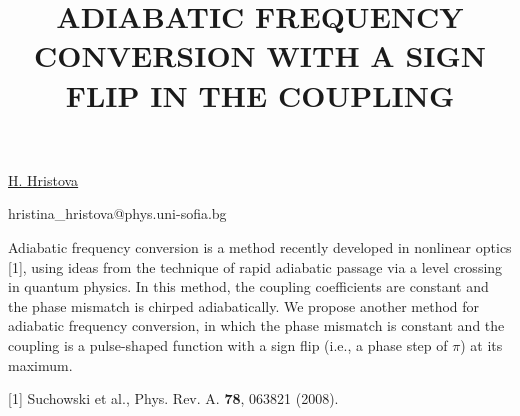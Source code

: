 \title{ADIABATIC FREQUENCY CONVERSION WITH A SIGN FLIP IN THE COUPLING}

\underline{H. Hristova} 

{\normalsize{\vspace{-4mm}
\unisofia

\email hristina\_hristova@phys.uni-sofia.bg}}

Adiabatic frequency conversion is a method recently developed in nonlinear optics [1], using ideas from the technique of rapid adiabatic passage via a level crossing in quantum physics. In this method, the coupling coefficients are constant and the phase mismatch is chirped adiabatically. We propose another method for adiabatic frequency conversion, in which the phase mismatch is constant and the coupling is a pulse-shaped function with a sign flip (i.e., a phase step of $\pi$) at its maximum.

{\normalsize
[1] Suchowski et al., Phys. Rev. A. \textbf{78}, 063821 (2008).
}

\vspace{\baselineskip} 